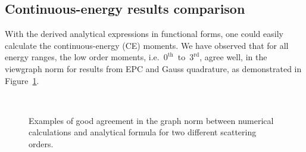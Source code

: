 \documentclass[review]{elsarticle}
\begin{document}
\subsection{Continuous-energy results comparison}
With the derived analytical expressions in functional forms, one could easily calculate the continuous-energy (CE) moments. %
We have observed that for all energy ranges, the low order moments, i.e.~$0^\mathrm{th}$~to~$3^\mathrm{rd}$, agree well, in the viewgraph norm for results from  EPC and Gauss quadrature, as demonstrated in Figure~\ref{fg:gde}.


\begin{figure}[ht!]
	\centering
	~
	\caption{Examples of good agreement in the graph norm between numerical calculations and analytical formula for two different scattering orders.}
	\label{fg:gde}
\end{figure}
\end{document}
